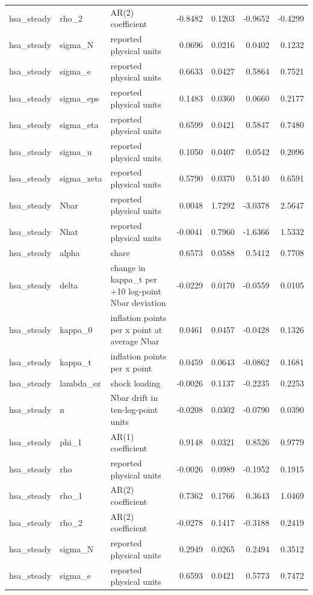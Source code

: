 \begin{tabular}{lllrrrr}
hsa\_steady & rho\_2 & AR(2) coefficient & -0.8482 & 0.1203 & -0.9652 & -0.4299 \\
hsa\_steady & sigma\_N & reported physical units & 0.0696 & 0.0216 & 0.0402 & 0.1232 \\
hsa\_steady & sigma\_e & reported physical units & 0.6633 & 0.0427 & 0.5864 & 0.7521 \\
hsa\_steady & sigma\_eps & reported physical units & 0.1483 & 0.0360 & 0.0660 & 0.2177 \\
hsa\_steady & sigma\_eta & reported physical units & 0.6599 & 0.0421 & 0.5847 & 0.7480 \\
hsa\_steady & sigma\_u & reported physical units & 0.1050 & 0.0407 & 0.0542 & 0.2096 \\
hsa\_steady & sigma\_zeta & reported physical units & 0.5790 & 0.0370 & 0.5140 & 0.6591 \\
hsa\_steady & Nbar & reported physical units & 0.0048 & 1.7292 & -3.0378 & 2.5647 \\
hsa\_steady & Nhat & reported physical units & -0.0041 & 0.7960 & -1.6366 & 1.5332 \\
hsa\_steady & alpha & share & 0.6573 & 0.0588 & 0.5412 & 0.7708 \\
hsa\_steady & delta & change in kappa\_t per +10 log-point Nbar deviation & -0.0229 & 0.0170 & -0.0559 & 0.0105 \\
hsa\_steady & kappa\_0 & inflation points per x point at average Nbar & 0.0461 & 0.0457 & -0.0428 & 0.1326 \\
hsa\_steady & kappa\_t & inflation points per x point & 0.0459 & 0.0643 & -0.0862 & 0.1681 \\
hsa\_steady & lambda\_ez & shock loading & -0.0026 & 0.1137 & -0.2235 & 0.2253 \\
hsa\_steady & n & Nbar drift in ten-log-point units & -0.0208 & 0.0302 & -0.0790 & 0.0390 \\
hsa\_steady & phi\_1 & AR(1) coefficient & 0.9148 & 0.0321 & 0.8526 & 0.9779 \\
hsa\_steady & rho & reported physical units & -0.0026 & 0.0989 & -0.1952 & 0.1915 \\
hsa\_steady & rho\_1 & AR(2) coefficient & 0.7362 & 0.1766 & 0.3643 & 1.0469 \\
hsa\_steady & rho\_2 & AR(2) coefficient & -0.0278 & 0.1417 & -0.3188 & 0.2419 \\
hsa\_steady & sigma\_N & reported physical units & 0.2949 & 0.0265 & 0.2494 & 0.3512 \\
hsa\_steady & sigma\_e & reported physical units & 0.6593 & 0.0421 & 0.5773 & 0.7472 \\

\end{tabular}
